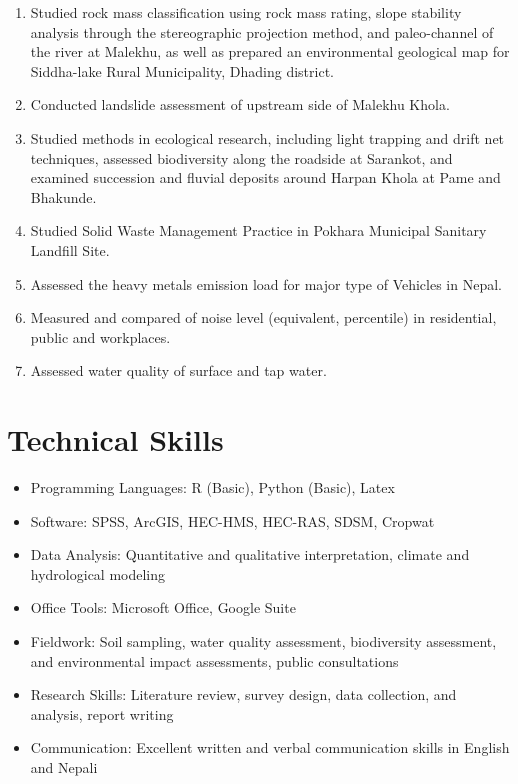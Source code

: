 \documentclass[a4paper,11.5pt]{article}
\begin{document}
\begin{enumerate}
    \item Studied rock mass classification using rock mass rating, slope stability analysis through the  stereographic projection method, and paleo-channel of the river at Malekhu, as well as prepared an environmental geological map for Siddha-lake Rural Municipality, Dhading district.
    \item Conducted landslide assessment of upstream side of Malekhu Khola.
    \item Studied methods in ecological research, including light trapping and drift net techniques, assessed biodiversity along the roadside at Sarankot, and examined succession and fluvial deposits around Harpan Khola at Pame and Bhakunde.
    \item Studied Solid Waste Management Practice in Pokhara Municipal Sanitary Landfill Site.
    \item Assessed the heavy metals emission load for major type of Vehicles in Nepal.
    \item Measured and compared of noise level (equivalent, percentile) in residential, public and workplaces.
    \item Assessed water quality of surface and tap water.
 
\end{enumerate}

\section{Technical Skills}
\begin{itemize}
    \item Programming Languages: R (Basic), Python (Basic), Latex
    \item Software: SPSS, ArcGIS, HEC-HMS, HEC-RAS, SDSM, Cropwat
    \item Data Analysis: Quantitative and qualitative interpretation, climate and hydrological modeling
    \item Office Tools: Microsoft Office, Google Suite
    \item Fieldwork: Soil sampling, water quality assessment, biodiversity assessment, and environmental impact assessments, public consultations
    \item Research Skills: Literature review, survey design, data collection, and analysis, report writing
    \item Communication: Excellent written and verbal communication skills in English and Nepali
\end{itemize}
\end{document}
